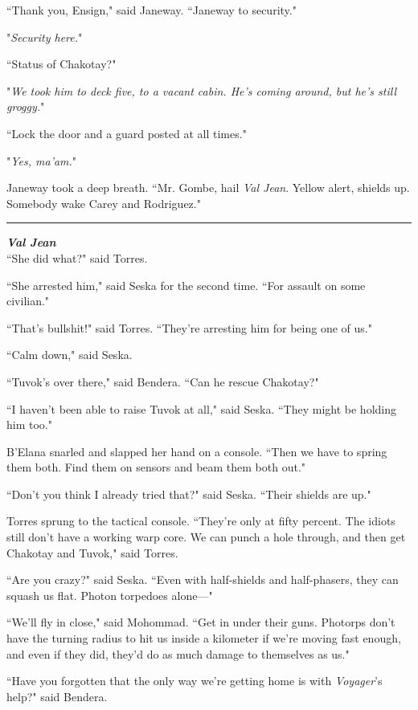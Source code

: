 \documentclass[twoside,letterpaper,12pt]{memoir}
\begin{document}
``Thank you, Ensign," said Janeway. ``Janeway to security."

"\textit{Security here.}"

``Status of Chakotay?"

"\textit{We took him to deck five, to a vacant cabin. He’s coming around, but he’s still groggy.}"

``Lock the door and a guard posted at all times."

"\textit{Yes, ma'am.}"

Janeway took a deep breath. ``Mr. Gombe, hail \textit{Val Jean}. Yellow alert, shields up. Somebody wake Carey and Rodriguez."

\begin{center}\rule{3cm}{0.4 pt}\end{center}

\noindent\textit{\textbf{Val Jean}}\\

``She did what?" said Torres.

``She arrested him," said Seska for the second time. ``For assault on some civilian."

``That's bullshit!" said Torres. ``They're arresting him for being one of us."

``Calm down," said Seska.

``Tuvok's over there," said Bendera. ``Can he rescue Chakotay?"

``I haven't been able to raise Tuvok at all," said Seska. ``They might be holding him too."

B'Elana snarled and slapped her hand on a console. ``Then we have to spring them both. Find them on sensors and beam them both out."

``Don't you think I already tried that?" said Seska. ``Their shields are up."

Torres sprung to the tactical console. ``They're only at fifty percent. The idiots still don't have a working warp core. We can punch a hole through, and then get Chakotay and Tuvok," said Torres.

``Are you crazy?" said Seska. ``Even with half-shields and half-phasers, they can squash us flat. Photon torpedoes alone---"

``We'll fly in close," said Mohommad. ``Get in under their guns. Photorps don't have the turning radius to hit us inside a kilometer if we're moving fast enough, and even if they did, they'd do as much damage to themselves as us."

``Have you forgotten that the only way we're getting home is with \textit{Voyager}'s help?" said Bendera.
\end{document}
